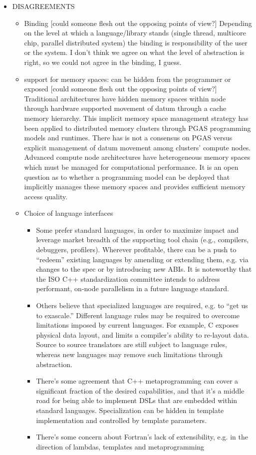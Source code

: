 \begin{itemize}
\item  DISAGREEMENTS
  \begin{itemize}
  \item Binding [could someone flesh out the opposing points of view?] Depending on the level at which a language/library stands (single thread, multicore chip, parallel distributed system) the binding is responsibility of the user or the system. I don't think we agree on what the level of abstraction is right, so we could not agree in the binding, I guess.
  \item support for memory spaces: can be hidden from the programmer or exposed [could someone flesh out the opposing points of view?]  Traditional architectures have hidden memory spaces within node through hardware supported movement of datum through a cache memory hierarchy.  This implicit memory space management strategy has been applied to distributed memory clusters through PGAS programming models and runtimes.  There has is not a consensus on PGAS versus explicit management of datum movement among clusters' compute nodes.  Advanced compute node architectures have heterogeneous memory spaces which must be managed for computational performance.  It is an open question as to whether a programming model can be deployed that implicitly manages these memory spaces and provides sufficient memory access quality.

  \item Choice of language interfaces
    \begin{itemize}
    \item Some prefer standard languages, in order to maximize impact and leverage market breadth of the supporting tool chain (e.g., compilers, debuggers, profilers).  Wherever profitable, there can be a push to ``redeem'' existing languages by amending or extending them, e.g. via changes to the spec or by introducing new ABIs.  It is noteworthy that the ISO C++ standardization committee intends to address performant, on-node parallelism in a future language standard.
    \item Others believe that specialized languages are required, e.g. to ``get us to exascale.''  Different language rules may be required to overcome limitations imposed by current languages.  For example, C exposes physical data layout, and limits a compiler's ability to re-layout data.  Source to source translators are still subject to language rules, whereas new languages may remove such limitations through abstraction.
    \item There's some agreement that C++ metaprogramming can cover a significant fraction of the desired capabilities, and that it's a middle road for being able to implement DSLs that are embedded within standard languages.  Specialization can be hidden in template implementation and controlled by template parameters.
    \item There's some concern about Fortran's lack of extensibility, e.g. in the direction of lambdas, templates and metaprogramming
    \end{itemize}
  \end{itemize}


\end{itemize}
